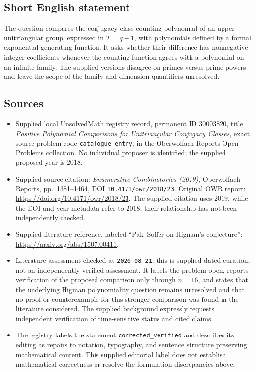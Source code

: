 \documentclass[11pt]{article}
\begin{document}
\subsection{Short English statement}
The question compares the conjugacy-class counting polynomial of an upper unitriangular group, expressed in \(T=q-1\), with polynomials defined by a formal exponential generating function. It asks whether their difference has nonnegative integer coefficients whenever the counting function agrees with a polynomial on an infinite family. The supplied versions disagree on primes versus prime powers and leave the scope of the family and dimension quantifiers unresolved.
\subsection{Sources}
\begin{itemize}
\item Supplied local UnsolvedMath registry record, permanent ID \(30003820\), title \emph{Positive Polynomial Comparisons for Unitriangular Conjugacy Classes}, exact source problem code \texttt{catalogue entry}, in the Oberwolfach Reports Open Problems collection. No individual proposer is identified; the supplied proposed year is \(2018\).
\item Supplied source citation: \emph{Enumerative Combinatorics (2019)}, Oberwolfach Reports, pp.\ 1381--1464, DOI \texttt{10.4171/owr/2018/23}. Original OWR report: \url{https://doi.org/10.4171/owr/2018/23}. The supplied citation uses \(2019\), while the DOI and year metadata refer to \(2018\); their relationship has not been independently checked.
\item Supplied literature reference, labeled ``Pak--Soffer on Higman's conjecture'': \url{https://arxiv.org/abs/1507.00411}.
\item Literature assessment checked at \texttt{2026-08-21}: this is supplied dated curation, not an independently verified assessment. It labels the problem open, reports verification of the proposed comparison only through \(n=16\), and states that the underlying Higman polynomiality question remains unresolved and that no proof or counterexample for this stronger comparison was found in the literature considered. The supplied background expressly requests independent verification of time-sensitive status and cited claims.
\item The registry labels the statement \texttt{corrected\_verified} and describes its editing as repairs to notation, typography, and sentence structure preserving mathematical content. This supplied editorial label does not establish mathematical correctness or resolve the formulation discrepancies above.
\end{itemize}
\end{document}
